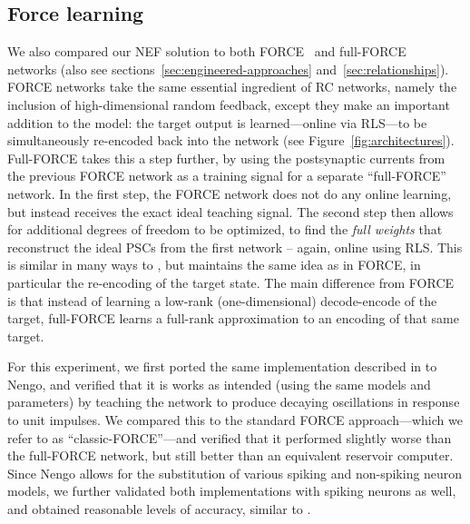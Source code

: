 
\subsection{Force learning}
\label{sec:force-comparison}

We also compared our NEF solution to both FORCE~\citep{sussillo2009generating} and full-FORCE~\citep{depasquale2018full} networks (also see sections~\ref{sec:engineered-approaches} and~\ref{sec:relationships}).
FORCE networks take the same essential ingredient of RC networks, namely the inclusion of high-dimensional random feedback, except they make an important addition to the model: the target output is learned---online via RLS---to be simultaneously re-encoded back into the network (see Figure~\ref{fig:architectures}).
Full-FORCE takes this a step further, by using the postsynaptic currents from the previous FORCE network as a training signal for a separate ``full-FORCE'' network. 
In the first step, the FORCE network does not do any online learning, but instead receives the exact ideal teaching signal.
The second step then allows for additional degrees of freedom to be optimized, to find the \emph{full weights} that reconstruct the ideal PSCs from the first network -- again, online using RLS.
This is similar in many ways to \citet{tripp2006neural}, but maintains the same idea as in FORCE, in particular the re-encoding of the target state.
The main difference from FORCE is that instead of learning a low-rank (one-dimensional) decode-encode of the target, full-FORCE learns a full-rank approximation to an encoding of that same target.

For this experiment, we first ported the same implementation described in \citet{depasquale2018full} to Nengo, and verified that it is works as intended (using the same models and parameters) by teaching the network to produce decaying oscillations in response to unit impulses.
We compared this to the standard FORCE approach---which we refer to as ``classic-FORCE''---and verified that it performed slightly worse than the full-FORCE network, but still better than an equivalent reservoir computer.
Since Nengo allows for the substitution of various spiking and non-spiking neuron models, we further validated both implementations with spiking neurons as well, and obtained reasonable levels of accuracy, similar to \citet{depasquale2016using, thalmeier2016learning, nicola2016supervised}.

